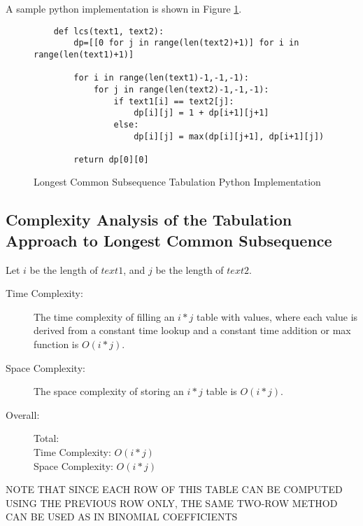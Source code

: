 A sample python implementation is shown in Figure \ref{fig:lcs-dp}.

\begin{figure}[H]
    \centering
    \begin{lstlisting}
    def lcs(text1, text2):
        dp=[[0 for j in range(len(text2)+1)] for i in range(len(text1)+1)]
    
        for i in range(len(text1)-1,-1,-1):
            for j in range(len(text2)-1,-1,-1):
                if text1[i] == text2[j]:
                    dp[i][j] = 1 + dp[i+1][j+1]
                else:
                    dp[i][j] = max(dp[i][j+1], dp[i+1][j])
    
        return dp[0][0]
    \end{lstlisting}
    \caption{Longest Common Subsequence Tabulation Python Implementation}
    \label{fig:lcs-dp}
\end{figure}

\subsection{Complexity Analysis of the Tabulation Approach to Longest Common Subsequence}

Let $i$ be the length of $text1$, and $j$ be the length of $text2$.

\begin{description}
    \item[Time Complexity:]
        The time complexity of filling an $i * j$ table with values, where each value is derived from a constant time lookup and a constant time addition or max function is $O(i * j)$.

    \item[Space Complexity:] 
        The space complexity of storing an $i * j$ table is $O(i * j)$.

        
    \item[Overall:] Total:\\
        Time Complexity: $O(i * j)$\\
        Space Complexity: $O(i * j)$
    
\end{description}

NOTE THAT SINCE EACH ROW OF THIS TABLE CAN BE COMPUTED USING THE PREVIOUS ROW ONLY, THE SAME TWO-ROW METHOD CAN BE USED AS IN BINOMIAL COEFFICIENTS